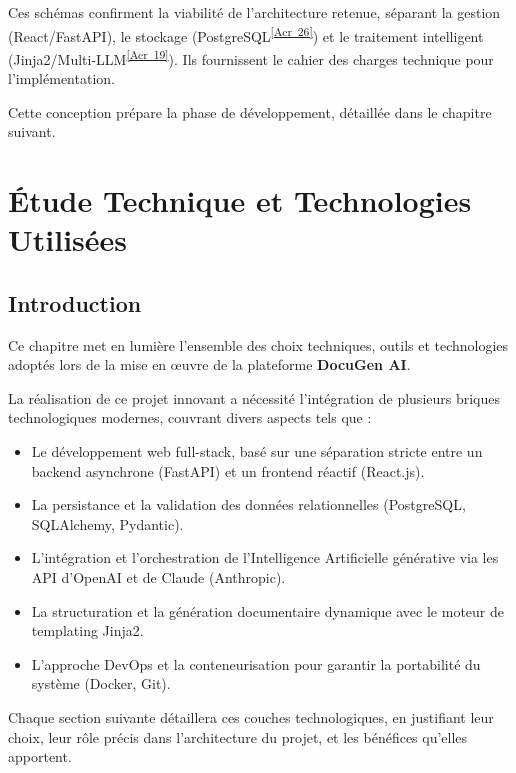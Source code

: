 \documentclass[12pt, a4paper]{report}
\newcommand{\acref}[1]{\textsuperscript{\hyperlink{acr:#1}{[Acr~#1]}}}
\begin{document}
Ces schémas confirment la viabilité de l'architecture retenue, séparant la gestion (React/FastAPI), le stockage (PostgreSQL\acref{26}) et le traitement intelligent (Jinja2/Multi-LLM\acref{19}). Ils fournissent le cahier des charges technique pour l'implémentation. 

Cette conception prépare la phase de développement, détaillée dans le chapitre suivant.

\chapter{Étude Technique et Technologies Utilisées}

\section*{Introduction}
Ce chapitre met en lumière l’ensemble des choix techniques, outils et technologies adoptés lors de la mise en œuvre de la plateforme \textbf{DocuGen AI}. 

La réalisation de ce projet innovant a nécessité l’intégration de plusieurs briques technologiques modernes, couvrant divers aspects tels que :
\begin{itemize}
    \item Le développement web full-stack, basé sur une séparation stricte entre un backend asynchrone (FastAPI) et un frontend réactif (React.js).
    \item La persistance et la validation des données relationnelles (PostgreSQL, SQLAlchemy, Pydantic).
    \item L'intégration et l'orchestration de l'Intelligence Artificielle générative via les API d'OpenAI et de Claude (Anthropic).
    \item La structuration et la génération documentaire dynamique avec le moteur de templating Jinja2.
    \item L'approche DevOps et la conteneurisation pour garantir la portabilité du système (Docker, Git).
\end{itemize}

Chaque section suivante détaillera ces couches technologiques, en justifiant leur choix, leur rôle précis dans l’architecture du projet, et les bénéfices qu'elles apportent.

\end{document}
